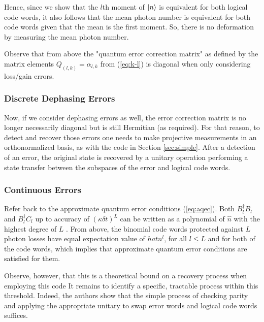 \documentclass[12]{amsart}
\newcommand\0{\mathbf{0}}
\newcommand\<{\langle}
\renewcommand\>{\rangle}
\begin{document}
Hence, since we show that the $l$th moment of $\ket{n}$ is equivalent for both logical code words, it also follows that the mean photon number is equivalent for both code words given that the mean is the first moment. So, there is no deformation by measuring the mean photon number.

Observe that from above the "quantum error correction matrix" as defined by the matrix elements $Q_{(l, k)} = \alpha_{l, k}$ from (\ref{eq:k-l}) is diagonal when only considering loss/gain errors.

\subsubsection{Discrete Dephasing Errors}

Now, if we consider dephasing errors as well, the error correction matrix is no longer necessarily diagonal but is still Hermitian (as required). For that reason, to detect and recover those errors one needs to make projective measurements in an orthonormalized basis, as with the code in Section \ref{sec:simple}. After a detection of an error, the original state is recovered by a unitary operation performing a state transfer between the subspaces of the error and logical code words.

\subsubsection{Continuous Errors}
\label{sec:cat-cont}

Refer back to the approximate quantum error conditions (\ref{eq:aqec}). Both $B_l^\dag B_l$ and $B_l^\dag C_l$ up to accuracy of $(\kappa \delta t)^L$ can be written as a polynomial of $\hat{n}$ with the highest degree of $L$ \cite{michael2016new}. From above, the binomial code words protected against $L$ photon losses have equal expectation value of $hat{n}^l$, for all $l \leq L$ and for both of the code words, which implies that approximate quantum error conditions are satisfied for them.

Observe, however, that this is a theoretical bound on a recovery process when employing this code It remains to identify a specific, tractable process within this threshold. Indeed, the authors show that the simple process of checking parity and applying the appropriate unitary to swap error words and logical code words suffices.
\end{document}
